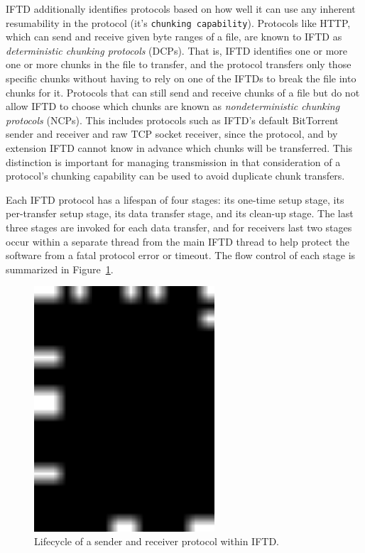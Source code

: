 IFTD additionally identifies protocols based on how well it can use any inherent resumability in the protocol (it's \texttt{chunking capability}).  Protocols like HTTP, which can send and receive given byte ranges of a file, are known to IFTD as \textit{deterministic chunking protocols} (DCPs).  That is, IFTD identifies one or more one or more chunks in the file to transfer, and the protocol transfers only those specific chunks without having to rely on one of the IFTDs to break the file into chunks for it.  Protocols that can still send and receive chunks of a file but do not allow IFTD to choose which chunks are known as \textit{nondeterministic chunking protocols} (NCPs).  This includes protocols such as IFTD's default BitTorrent sender and receiver and raw TCP socket receiver, since the protocol, and by extension IFTD cannot know in advance which chunks will be transferred.  This distinction is important for managing transmission in that consideration of a protocol's chunking capability can be used to avoid duplicate chunk transfers.

Each IFTD protocol has a lifespan of four stages:  its one-time setup stage, its per-transfer setup stage, its data transfer stage, and its clean-up stage.  The last three stages are invoked for each data transfer, and for receivers last two stages occur within a separate thread from the main IFTD thread to help protect the software from a fatal protocol error or timeout.  The flow control of each stage is summarized in Figure~\ref{protocol-lifecycle}.

\begin{figure}[h!]
    \centering
    \includegraphics[width=0.6\textwidth]{diagrams/protocol-lifecycle}
    \caption{Lifecycle of a sender and receiver protocol within IFTD.}
    \label{protocol-lifecycle}
\end{figure}

